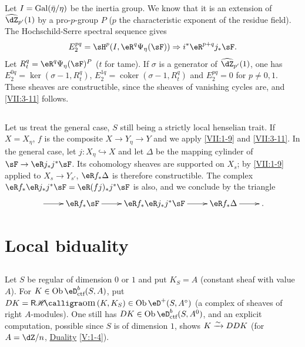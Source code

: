Let $I=\operatorname{Gal}(\bar\eta/\eta)$ be the inertia group. We know that it is an
extension of $\widehat\dZ_{p'}(1)$ by a pro-$p$-group $P$ ($p$ the
characteristic exponent of the residue field). The Hochschild-Serre spectral sequence
gives
\[
  E_2^{p q} = \sH^p(I,\eR^q\Psi_\eta(\sF))\Rightarrow i^\ast \eR^{p+q}j_\ast\sF \text{.}
\]
Let $R_t^q = \eR^q\Psi_\eta(\sF)^P$ ($t$ for tame). If $\sigma$ is a
generator of $\widehat\dZ_{p'}(1)$, one has
$E_2^{0 q} = \ker(\sigma-1,R_t^q)$,
$E_2^{1 q} = \operatorname{coker}(\sigma-1,R_t^q)$ and $E_2^{p q} = 0$ for
$p\ne 0,1$. These sheaves are constructible, since the sheaves of vanishing
cycles are, and \ref{VII:3-11} follows.




\subsection{}\label{VII:3-12}

Let us treat the general case, $S$ still being a strictly local
henselian trait. If $X=X_\eta$, $f$ is the composite $X\to Y_\eta \to Y$ and we
apply \ref{VII:1-9} and \ref{VII:3-11}. In the general case, let
$j:X_\eta\hookrightarrow X$ and let $\Delta$ be the mapping cylinder of
$\sF \to \eR j_\ast j^\ast \sF$. Its cohomology sheaves are supported
on $X_s$; by \ref{VII:1-9} applied to $X_s \to Y_{s'}$,
$\eR f_\ast \Delta$ is therefore constructible. The complex
$\eR f_\ast \eR j_\ast j^\ast \sF = \eR(f j)_\ast j^\ast \sF$ is
also, and we conclude by the triangle
\[\xymatrix{
  \ar[r]
    & \eR f_\ast \sF \ar[r]
    & \eR f_\ast \eR j_\ast j^\ast \sF \ar[r]
    & \eR f_\ast \Delta \ar[r]
    & \text{.}
}\]










\section{Local biduality}\label{VII:4}




\subsection{}\label{VII:4-1}

Let $S$ be regular of dimension $0$ or $1$ and put $K_S=A$ (constant
sheaf with value $A$). For $K\in\ob\eD_\text{ctf}^b(S,A)$, put
$D K=\rHom(K,K_S)\in\ob\eD^+(S,A^\circ)$ (a complex of sheaves of
right $A$-modules). One still has $D K\in\ob\eD_\text{ctf}^b(S,A^0)$, and
an explicit computation, possible since $S$ is of dimension $1$, shows
$K\xrightarrow\sim D D K$ (for $A=\dZ/n$, \hyperref[V]{Duality} \ref{V:1-4}).




